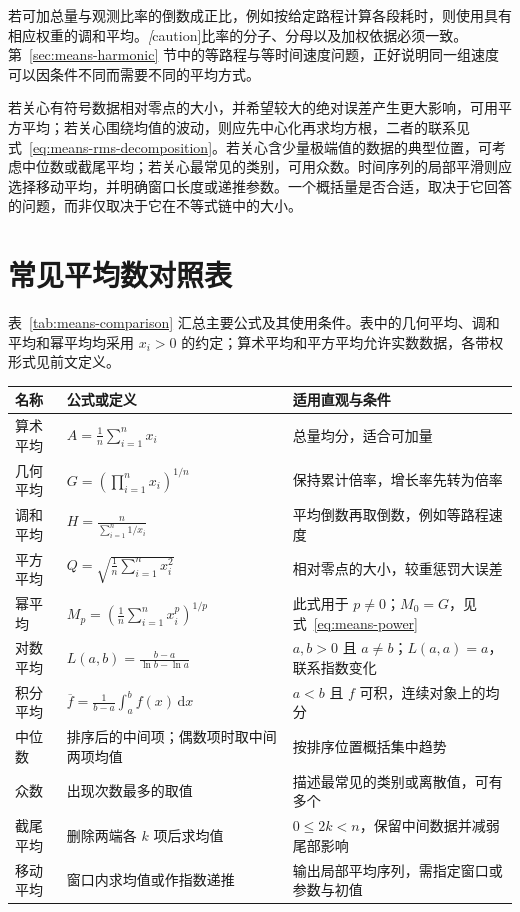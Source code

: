 \documentclass[UTF8,12pt,a4paper,fontset=fandol]{ctexart}
\begin{document}
若可加总量与观测比率的倒数成正比，例如按给定路程计算各段耗时，则使用具有相应权重的调和平均。\emph[caution]{比率的分子、分母以及加权依据必须一致。}第~\ref{sec:means-harmonic} 节中的等路程与等时间速度问题，正好说明同一组速度可以因条件不同而需要不同的平均方式。

若关心有符号数据相对零点的大小，并希望较大的绝对误差产生更大影响，可用平方平均；若关心围绕均值的波动，则应先中心化再求均方根，二者的联系见式~\eqref{eq:means-rms-decomposition}。若关心含少量极端值的数据的典型位置，可考虑中位数或截尾平均；若关心最常见的类别，可用众数。时间序列的局部平滑则应选择移动平均，并明确窗口长度或递推参数。一个概括量是否合适，取决于它回答的问题，而非仅取决于它在不等式链中的大小。

\section{常见平均数对照表}
\label{sec:means-comparison}

表~\ref{tab:means-comparison} 汇总主要公式及其使用条件。表中的几何平均、调和平均和幂平均均采用 $x_i>0$ 的约定；算术平均和平方平均允许实数数据，各带权形式见前文定义。

\begin{center}
\label{tab:means-comparison}
\begin{tabularx}{\textwidth}{L{3.1cm}Y Y}
\toprule
名称 & 公式或定义 & 适用直观与条件 \\
\midrule
算术平均 & $\displaystyle A=\frac{1}{n}\sum_{i=1}^n x_i$ & 总量均分，适合可加量 \\
几何平均 & $\displaystyle G=\left(\prod_{i=1}^n x_i\right)^{1/n}$ & 保持累计倍率，增长率先转为倍率 \\
调和平均 & $\displaystyle H=\frac{n}{\sum_{i=1}^n1/x_i}$ & 平均倒数再取倒数，例如等路程速度 \\
平方平均 & $\displaystyle Q=\sqrt{\frac{1}{n}\sum_{i=1}^n x_i^2}$ & 相对零点的大小，较重惩罚大误差 \\
幂平均 & $\displaystyle M_p=\left(\frac{1}{n}\sum_{i=1}^n x_i^p\right)^{1/p}$ & 此式用于 $p\ne0$；$M_0=G$，见式~\eqref{eq:means-power} \\
对数平均 & $\displaystyle L(a,b)=\frac{b-a}{\ln b-\ln a}$ & $a,b>0$ 且 $a\ne b$；$L(a,a)=a$，联系指数变化 \\
积分平均 & $\displaystyle\overline f=\frac{1}{b-a}\int_a^b f(x)\,\mathrm dx$ & $a<b$ 且 $f$ 可积，连续对象上的均分 \\
中位数 & 排序后的中间项；偶数项时取中间两项均值 & 按排序位置概括集中趋势 \\
众数 & 出现次数最多的取值 & 描述最常见的类别或离散值，可有多个 \\
截尾平均 & 删除两端各 $k$ 项后求均值 & $0\le2k<n$，保留中间数据并减弱尾部影响 \\
移动平均 & 窗口内求均值或作指数递推 & 输出局部平均序列，需指定窗口或参数与初值 \\
\bottomrule
\end{tabularx}
\end{center}
\end{document}
